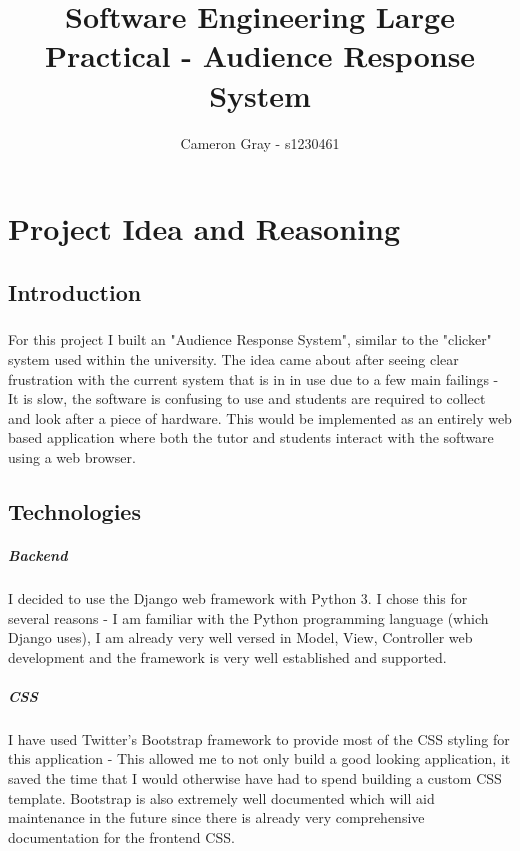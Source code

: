 \documentclass[10pt]{report}
\title{Software Engineering Large Practical - Audience Response System}
\author{Cameron Gray - s1230461}
\begin{document}
	\maketitle
	
	\chapter*{Project Idea and Reasoning}
	\section*{Introduction}
	\paragraph{}
	For this project I built an "Audience Response System", similar to the "clicker" system used within
	the university.  The idea came about after seeing clear frustration with the current system that is in
	in use due to a few main failings - It is slow, the software is confusing to use and students are
	required to collect and look after a piece of hardware.  This would be implemented as an entirely web
	based application where both the tutor and students interact with the software using a web browser.
	
	\section*{Technologies}
	\paragraph{Backend}	
	I decided to use the Django web framework with Python 3.  I chose this for several reasons - I am
	familiar with the Python programming language (which Django uses), I am already very well versed in
	Model, View, Controller web development and the framework is very well established and supported.
	
	\paragraph{CSS}
	I have used Twitter's Bootstrap framework to provide most of the CSS styling for this application -
	This allowed me to not only build a good looking application, it saved the time that I would otherwise
	have had to spend building a custom CSS template.  Bootstrap is also extremely well documented which
	will aid maintenance in the future since there is already very comprehensive documentation for the
	frontend CSS.
	
\end{document}
